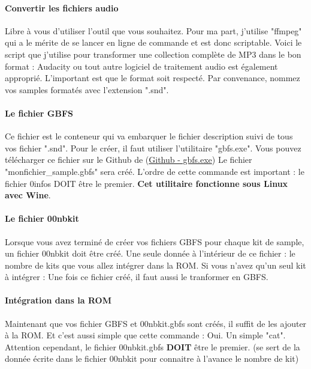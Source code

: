 \documentclass[12pt,a4paper]{article}
\begin{document}
    \paragraph{Convertir les fichiers audio} Libre à vous d'utiliser l'outil que vous souhaitez.
    Pour ma part, j'utilise "ffmpeg" qui a le mérite de se lancer en ligne de commande et est donc scriptable.
    Voici le script que j'utilise pour transformer une collection complète de MP3 dans le bon format :
    Audacity ou tout autre logiciel de traitement audio est également approprié.
    L'important est que le format soit respecté.
    Par convenance, nommez vos samples formatés avec l'extension ".snd".

    \paragraph{Le fichier GBFS} Ce fichier est le conteneur qui va embarquer le fichier description suivi de tous vos fichier ".snd".
    Pour le créer, il faut utiliser l'utilitaire "gbfs.exe".
    Vous pouvez télécharger ce fichier sur le Github de \FAT (\href{https://github.com/cbrouillard/furiousadvancetracker/blob/master/gbfs.exe?raw=true}{Github - gbfs.exe})
    Le fichier "monfichier\_sample.gbfs" sera créé.
    L'ordre de cette commande est important : le fichier 0infos DOIT être le premier.
    {\bf Cet utilitaire fonctionne sous Linux avec Wine}.

    \paragraph{Le fichier 00nbkit} Lorsque vous avez terminé de créer vos fichiers GBFS pour chaque kit de sample, un fichier 00nbkit doit être créé.
    Une seule donnée à l'intérieur de ce fichier : le nombre de kits que vous allez intégrer dans la ROM.
    Si vous n'avez qu'un seul kit à intégrer :
    Une fois ce fichier créé, il faut aussi le tranformer en GBFS.

    \paragraph{Intégration dans la ROM} Maintenant que vos fichier GBFS et 00nbkit.gbfs sont créés, il suffit de les ajouter à la ROM.
    Et c'est aussi simple que cette commande :
    Oui. Un simple "cat".
    Attention cependant, le fichier 00nbkit.gbfs {\bf DOIT} être le premier.
    (\FAT se sert de la donnée écrite dans le fichier 00nbkit pour connaitre à l'avance le nombre de kit)
    \medskip
\end{document}
